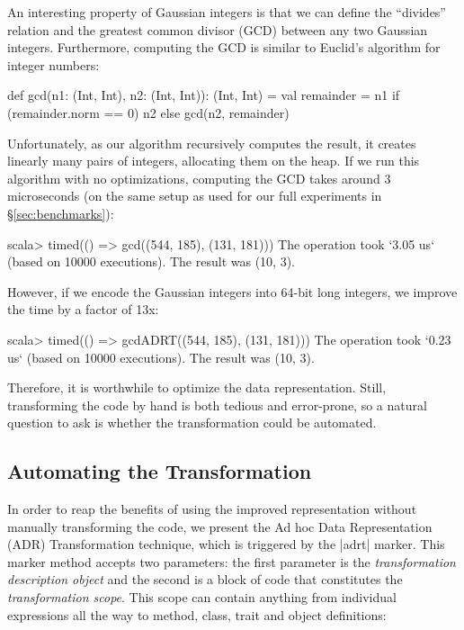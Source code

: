 An interesting property of Gaussian integers is that we can define the
``divides'' relation and the greatest common divisor (GCD) between any
two Gaussian integers. Furthermore, computing the GCD is similar to
Euclid's algorithm for integer numbers:

\begin{lstlisting-nobreak}
def gcd(n1: (Int, Int), n2: (Int, Int)): (Int, Int) = {
  val remainder = n1 %
  if (remainder.norm == 0) n2 else gcd(n2, remainder)
}
\end{lstlisting-nobreak}

Unfortunately, as our algorithm recursively computes the result, it creates linearly many pairs of integers, allocating them on the heap. If we run this algorithm with no optimizations, computing the GCD takes around 3 microseconds (on the same setup as used for our full experiments in \S\ref{sec:benchmarks}):

\begin{lstlisting-nobreak}
scala> timed(() => gcd((544, 185), (131, 181)))
The operation took `3.05 us` (based on 10000 executions).
The result was (10, 3).
\end{lstlisting-nobreak}

However, if we encode the Gaussian integers into 64-bit long integers, we improve the time by a factor of 13x:

\begin{lstlisting-nobreak}
scala> timed(() => gcdADRT((544, 185), (131, 181)))
The operation took `0.23 us` (based on 10000 executions).
The result was (10, 3).
\end{lstlisting-nobreak}

Therefore, it is worthwhile to optimize the data representation. Still, transforming the code by hand is both tedious and error-prone, so a natural question to ask is whether the transformation could be automated.

\subsection{Automating the Transformation}
\label{sec:automating}

In order to reap the benefits of using the improved representation
without manually transforming the code, we present the Ad hoc Data
Representation (ADR) Transformation technique, which is triggered
by the |adrt| marker. This marker method accepts two parameters: the
first parameter is the \emph{transformation description object} and the
second is a block of code that constitutes the \emph{transformation scope}. This
scope can contain anything from individual expressions all the way to method, class,
trait and object definitions:

